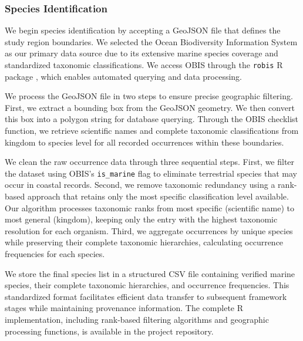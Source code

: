 \subsubsection{Species Identification}

We begin species identification by accepting a GeoJSON file that defines the study region boundaries. We selected the Ocean Biodiversity Information System \citep{Grassle1999} as our primary data source due to its extensive marine species coverage and standardized taxonomic classifications. We access OBIS through the \texttt{robis} R package \citep{robis}, which enables automated querying and data processing.

We process the GeoJSON file in two steps to ensure precise geographic filtering. First, we extract a bounding box from the GeoJSON geometry. We then convert this box into a polygon string for database querying. Through the OBIS checklist function, we retrieve scientific names and complete taxonomic classifications from kingdom to species level for all recorded occurrences within these boundaries.

We clean the raw occurrence data through three sequential steps. First, we filter the dataset using OBIS's \texttt{is\_marine} flag to eliminate terrestrial species that may occur in coastal records. Second, we remove taxonomic redundancy using a rank-based approach that retains only the most specific classification level available. Our algorithm processes taxonomic ranks from most specific (scientific name) to most general (kingdom), keeping only the entry with the highest taxonomic resolution for each organism. Third, we aggregate occurrences by unique species while preserving their complete taxonomic hierarchies, calculating occurrence frequencies for each species.

We store the final species list in a structured CSV file containing verified marine species, their complete taxonomic hierarchies, and occurrence frequencies. This standardized format facilitates efficient data transfer to subsequent framework stages while maintaining provenance information. The complete R implementation, including rank-based filtering algorithms and geographic processing functions, is available in the project repository.

